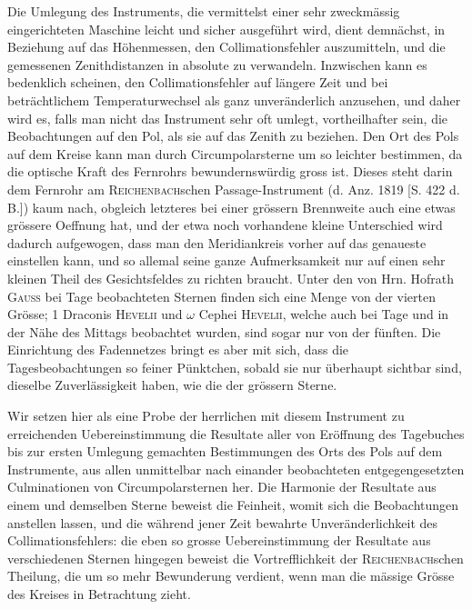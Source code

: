 Die Umlegung des Instruments, die vermittelst einer sehr zweckmässig eingerichteten Maschine
leicht und sicher ausgeführt wird, dient demnächst, in Beziehung auf das Höhenmessen, den
Collimationsfehler auszumitteln, und die gemessenen Zenithdistanzen in absolute zu verwandeln.
Inzwischen kann es bedenklich scheinen, den Collimationsfehler auf längere Zeit und bei
beträchtlichem Temperaturwechsel als ganz unveränderlich anzusehen, und daher wird es, falls man
nicht das Instrument sehr oft umlegt, vortheilhafter sein, die Beobachtungen auf den Pol, als sie
auf das Zenith zu beziehen. Den Ort des Pols auf dem Kreise kann man durch Circumpolarsterne um so
leichter bestimmen, da die optische Kraft des Fernrohrs bewundernswürdig gross ist. Dieses steht
darin dem Fernrohr am \textsc{Reichenbach}schen Passage-Instrument (d. Anz. 1819 [S. 422 d. B.])
kaum nach, obgleich letzteres bei einer grössern Brennweite auch eine etwas grössere Oeffnung hat,
und der etwa noch vorhandene kleine Unterschied wird dadurch aufgewogen, dass man den
Meridiankreis vorher auf das genaueste einstellen kann, und so allemal seine ganze Aufmerksamkeit
nur auf einen sehr kleinen Theil des Gesichtsfeldes zu richten braucht. Unter den von Hrn. Hofrath
\textsc{Gauss} bei Tage beobachteten Sternen finden sich eine Menge von der vierten Grösse; 1 Draconis \textsc{Hevelii} und $\omega$ Cephei \textsc{Hevelii}, welche auch bei Tage und in der
Nähe des Mittags beobachtet wurden, sind sogar nur von der fünften. Die Einrichtung des
Fadennetzes bringt es aber mit sich, dass die Tagesbeobachtungen so feiner Pünktchen, sobald sie
nur überhaupt sichtbar sind, dieselbe Zuverlässigkeit haben, wie die der grössern Sterne.

Wir setzen hier als eine Probe der herrlichen mit diesem Instrument zu erreichenden
Uebereinstimmung die Resultate aller von Eröffnung des Tagebuches bis zur ersten Umlegung gemachten
Bestimmungen des Orts des Pols auf dem Instrumente, aus allen unmittelbar nach einander beobachteten
entgegengesetzten Culminationen von Circumpolarsternen her. Die Harmonie der Resultate aus einem und
demselben Sterne beweist die Feinheit, womit sich die Beobachtungen anstellen lassen, und die
während jener Zeit bewahrte Unveränderlichkeit des Collimationsfehlers: die eben so grosse
Uebereinstimmung der Resultate aus verschiedenen Sternen hingegen beweist die Vortrefflichkeit der
\textsc{Reichenbach}schen Theilung, die um so mehr Bewunderung verdient, wenn man die mässige
Grösse des Kreises in Betrachtung zieht.

